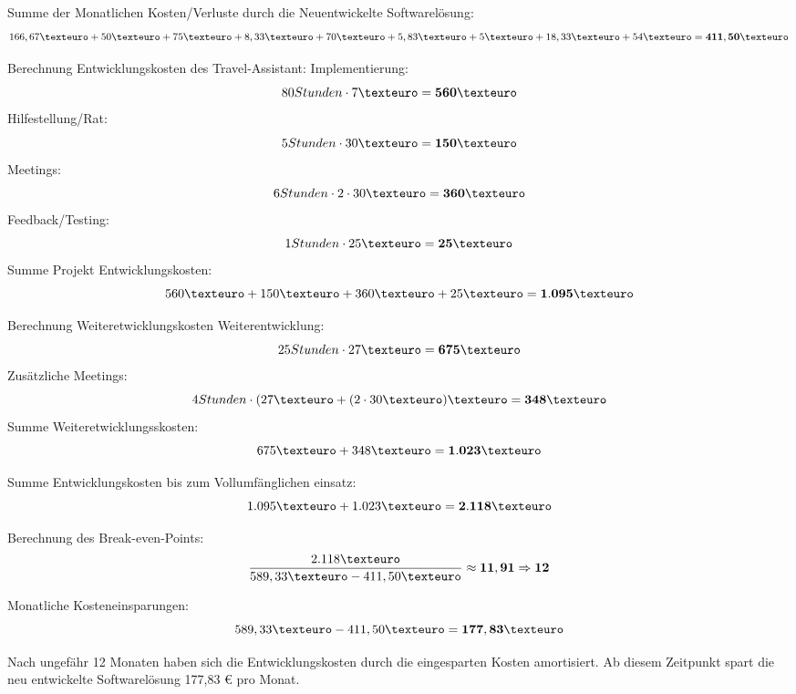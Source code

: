 Summe der Monatlichen Kosten/Verluste durch die Neuentwickelte Softwarelösung: \[166,67€ + 50€ + 75€ + 8,33€ + 70€ + 5,83€ + 5€ + 18,33€ +54€ =  \bf{411,50€} \]

Berechnung Entwicklungskosten des Travel-Assistant:
	Implementierung: \[ 80 Stunden \cdot 7€ =  \bf{560€} \]
	Hilfestellung/Rat: \[ 5 Stunden \cdot 30€ =  \bf{150€} \]
	Meetings: \[ 6 Stunden \cdot 2 \cdot 30€ =  \bf{360€} \]
	Feedback/Testing: \[ 1 Stunden \cdot 25€ =  \bf{25€} \]
Summe Projekt Entwicklungskosten: \[560€ + 150€ + 360€ + 25€ =  \bf{1.095€} \]

Berechnung Weiteretwicklungskosten
	Weiterentwicklung: \[ 25 Stunden \cdot 27€ =  \bf{675€} \]
	Zusätzliche Meetings: \[ 4 Stunden \cdot ( 27€ + ( 2 \cdot 30€)€ =  \bf{348€} \]
Summe Weiteretwicklungsskosten: \[675€ + 348€ =  \bf{1.023€} \]

Summe Entwicklungskosten bis zum Vollumfänglichen einsatz: \[1.095€ + 1.023€ =  \bf{2.118€} \]

Berechnung des Break-even-Points: \[ \displaystyle\frac{2.118€}{589,33€ - 411,50€} \approx  \bf{11,91} \Rightarrow 12 \] 

Monatliche Kosteneinsparungen:
\[ 589,33€ - 411,50€ =  \bf{177,83€} \]

Nach ungefähr 12 Monaten haben sich die Entwicklungskosten durch die eingesparten Kosten amortisiert. Ab diesem Zeitpunkt spart die neu entwickelte Softwarelösung 177,83 € pro Monat.